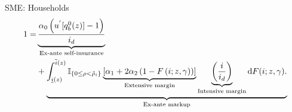 \documentclass[10pt,english,slidetop,compress,
              blue,mathserif,color=option]{beamer}
\theoremstyle{plain}
\theoremstyle{definition}
\begin{document}
\begin{frame}[allowframebreaks]{SME: Households}
    \begin{equation}
      \begin{split}
            1 
            =  
            &
            \underbrace{\frac{\alpha_{0}\left(u^{'}[q_{b}^{0}(z)]-1\right)}{i_{d}}}_{\text{Ex-ante self-insurance}} 
            \\
            &
            +
            \underbrace{
                  \int_{\underline{i}(z)}^{\overline{i}(z)}
                  \mathbb{I}_{\{0 \leq \rho < \tilde{\rho}_i\}}
                  \underbrace{
                    \left[
                        \alpha_{1}+2\alpha_{2}\left(1 - F\left(i;z,\gamma\right)\right)
                    \right]
                  }_{\text{Extensive margin}}
                  \underbrace{
                      \left(\frac{i}{i_d}\right)
                  }_{\text{Intensive margin}}
                  \text{d}F(i;z,\gamma).
            }_{\text{Ex-ante markup}}
      \end{split}
      \label{eq:z Euler-with-credit: asset pricing}
    \end{equation}




\end{frame}
\end{document}
